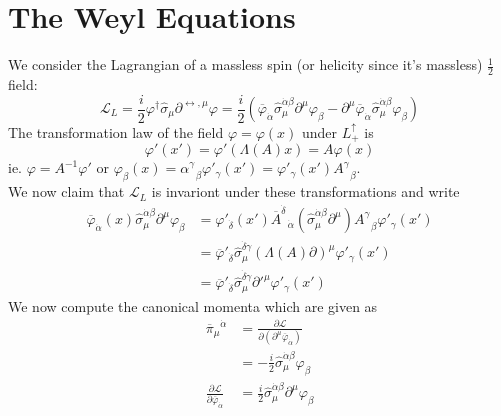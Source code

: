 \documentclass{report}
\begin{document}
\section{The Weyl Equations}
We consider the Lagrangian of a massless spin (or helicity since it's massless) $\frac{1}{2} $ field:
\begin{equation*}
  \mathcal{L}_L = \frac{i}{2}  \varphi^\dagger \hat{\sigma}_\mu \partial^{\leftrightarrow, \mu} \varphi = 
  \frac{i}{2} \left( \overline{\varphi}_{\dot{\alpha}} \hat{\sigma}_\mu^{\dot{\alpha} \beta} \partial^{\mu} \varphi_\beta - \partial^{\mu} \overline{\varphi}_{\dot{\alpha}} \hat{\sigma}^{\dot{\alpha} \beta} _\mu \varphi_\beta  \right) 
\end{equation*}
The transformation law of the field $\varphi = \varphi\left( x \right) $ under $L_+^{\uparrow} $ is 
\[
\varphi'\left( x' \right) = \varphi'\left( \Lambda\left( A \right) x \right) = A \varphi\left( x \right) 
\] ie. $\varphi = A^{-1} \varphi'$ or $\varphi_\beta\left( x \right) = \alpha ^{\gamma}_{\text{ }\beta} \varphi'_\gamma \left( x' \right) = \varphi'_\gamma\left( x' \right) A^{\gamma}_{\text{ }\beta} $.\\
We now claim that $\mathcal{L}_L$ is invariont under these transformations and write
\begin{align*}
  \overline{\varphi}_{\dot{\alpha}} \left( x \right) \hat{\sigma}_\mu^{\dot{\alpha} \beta} \partial^{\mu} \varphi_\beta &= \varphi'_{\dot{\delta}} \left( x' \right) \overline{A}^{\dot{\delta}}_{\text{ }\dot{\alpha}} \left( \hat{\sigma}_\mu^{\dot{\alpha}\beta} \partial^{\mu}  \right) A^{\gamma}_{\text{ }\beta} \varphi'_\gamma \left( x' \right)   \\
                                                                                                                      &= \overline{\varphi}'_{\dot{\delta}} \hat{\sigma}_\mu^{\dot{\delta} \gamma} \left( \Lambda\left( A \right) \partial  \right)^{\mu}  \varphi'_\gamma \left( x' \right)  \\
  &= \overline{\varphi}'_{\dot{\delta}} \hat{\sigma}_\mu^{\dot{\delta} \gamma} \partial'^{\mu} \varphi'_\gamma \left( x' \right)
\end{align*}
We now compute the canonical momenta which are given as
\begin{align*}
  \overline{\pi}_{\mu}^{\text{ }\dot{\alpha}} &=  \frac{\partial \mathcal{L} }{\partial \left( \partial^{\mu} \overline{\varphi}_{\dot{\alpha}}   \right) } \\
  &= -\frac{i}{2} \hat{\sigma}_\mu^{\dot{\alpha} \beta} \varphi_\beta \\
  \frac{\partial \mathcal{L} }{\partial \overline{\varphi}_{\dot{\alpha}} } &= \frac{i}{2} \hat{\sigma}_\mu^{\dot{\alpha} \beta} \partial^{\mu} \varphi_\beta \\
\end{align*}
\end{document}
